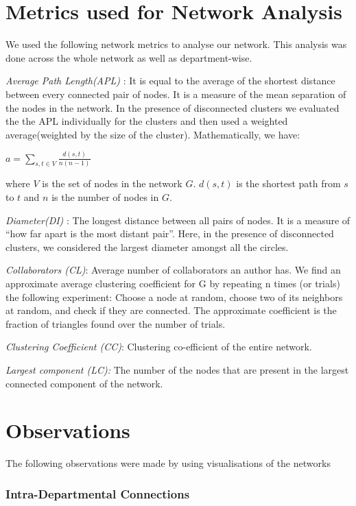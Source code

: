 \documentclass[conference,compsoc]{IEEEtran}
\begin{document}
\section{Metrics used for Network Analysis}

We used the following network metrics to analyse our network. This analysis was done across the whole network as well as department-wise.

\noindent \emph{Average Path Length(APL)} : It is equal to the average of the shortest distance between every connected pair of nodes. It is a measure of the mean separation of the nodes in the network. In the presence of disconnected clusters we evaluated the the APL individually for the clusters and then used a weighted average(weighted by the size of the cluster).
Mathematically, we have:
\begin{center}
$\displaystyle{a = \sum\limits_{s,t \in V} \frac{d(s,t)}{n(n-1)}}$
\end{center}
where $V$ is the set of nodes in the network $G$. $d(s,t)$ is the shortest path from $s$ to $t$ and $n$ is the number of nodes in $G$.

\noindent \emph{Diameter(DI)} :  The longest distance between all pairs of nodes. It is a measure of “how far apart is the most distant pair”. Here, in the presence of disconnected clusters, we considered the largest diameter amongst all the circles.

\noindent \emph{Collaborators (CL)}: Average number of collaborators an author has. We find an approximate average clustering coefficient for G by repeating n times (or trials) the following experiment: Choose a node at random, choose two of its neighbors at random, and check if they are connected. The approximate coefficient is the fraction of triangles found over the number of trials. 

\noindent \emph{Clustering Coefficient (CC)}: Clustering co-efficient of the entire network.

\noindent \emph{Largest component (LC):} The number of the nodes that are present in the largest connected component of the network.

\section{Observations}

The following observations were made by using visualisations of the networks

\subsubsection*{Intra-Departmental Connections}
\end{document}
